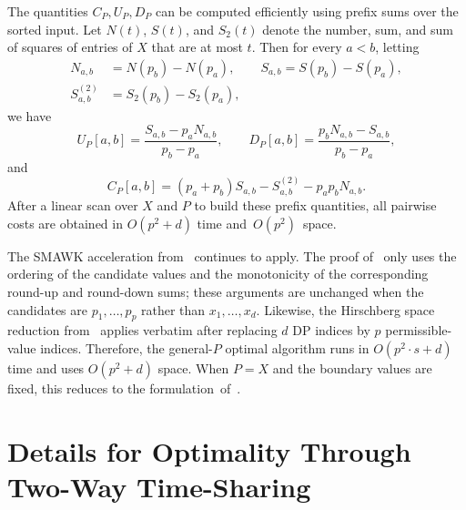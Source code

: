 \documentclass[11pt,letterpaper]{article}
\begin{document}
{The quantities $C_P,U_P,D_P$ can be computed efficiently using prefix sums over
the sorted input. Let $N(t)$, $S(t)$, and $S_2(t)$ denote the number, sum, and
sum of squares of entries of $X$ that are at most $t$. Then for every $a<b$,
letting
{\small
\[
\begin{aligned}
N_{a,b}&=N(p_b)-N(p_a),\qquad
S_{a,b}=S(p_b)-S(p_a),\\
S^{(2)}_{a,b}&=S_2(p_b)-S_2(p_a),
\end{aligned}
\]
}
we have
{\small
\[
U_P[a,b]=\frac{S_{a,b}-p_aN_{a,b}}{p_b-p_a},
\qquad
D_P[a,b]=\frac{p_bN_{a,b}-S_{a,b}}{p_b-p_a},
\]
}
and
\[
C_P[a,b]
=
(p_a+p_b)S_{a,b}
-
S^{(2)}_{a,b}
-
p_ap_bN_{a,b}.
\]
After a linear scan over $X$ and $P$ to build these prefix quantities, all
pairwise costs are obtained in $O(p^2+d)$ time \mbox{and $O(p^2)$ space.}

The SMAWK acceleration from~ continues to apply. The proof of~ only uses the ordering of the candidate values and the monotonicity of
the corresponding round-up and round-down sums; these arguments are unchanged
when the candidates are $p_1,\ldots,p_p$ rather than $x_1,\ldots,x_d$.
Likewise, the Hirschberg space reduction from~ applies verbatim
after replacing $d$ DP indices by $p$ permissible-value indices. Therefore, the
general-$P$ optimal algorithm runs in
$
O(p^2\cdot s + d)
$
time and uses $O(p^2+d)$ space. When $P=X$ and the boundary values are fixed,
this reduces to the \mbox{formulation of~.}

\section{Details for Optimality Through Two-Way Time-Sharing}
\label{app:timesharing-details}

}
\end{document}
